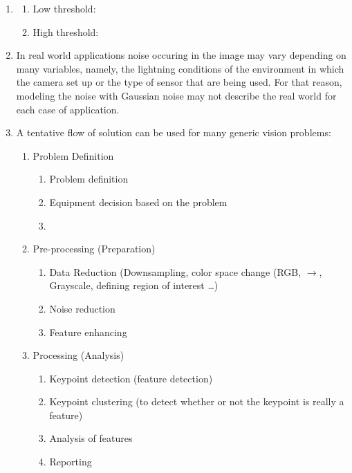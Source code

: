 \documentclass{article}
\begin{document}
\begin{enumerate}
	\item
	\begin{enumerate}
		\item Low threshold:
		\item High threshold:	
	\end{enumerate}
	\item In real world applications noise occuring in the image may vary
	depending on many variables, namely, the lightning conditions of the
	environment in which the camera set up or the type of sensor that are being
	used. For that reason, modeling the noise with Gaussian noise may not describe
	the real world for each case of application. 
	\item A tentative flow of solution can be used for many generic vision
	problems:
	\begin{enumerate}
		\item Problem Definition
		\begin{enumerate}
			\item Problem definition
			\item Equipment decision based on the problem
			\item 
		\end{enumerate}
		\item Pre-processing (Preparation)
		\begin{enumerate}
			\item Data Reduction (Downsampling, color space change (RGB, $\to$,
			Grayscale, defining region of interest \ldots)
			\item Noise reduction
			\item Feature enhancing 
		\end{enumerate}
		\item Processing (Analysis)
		\begin{enumerate}
	    	\item Keypoint detection (feature detection)
	    	\item Keypoint clustering (to detect whether or not the keypoint is really
	    	a feature)
	    	\item Analysis of features
	    	\item Reporting
		\end{enumerate}
	\end{enumerate}
\end{enumerate}
\pagebreak
\end{document}
